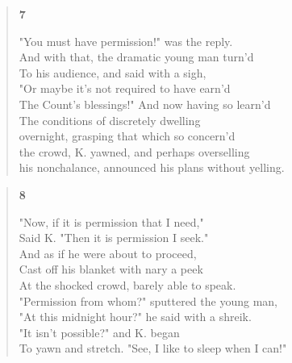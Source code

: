 \documentclass{article}
\begin{document}
\begin{verse}
  \begin{center}
    \textbf{7} \\
  \end{center}
  "You must have permission!" was the reply. \\
  And with that, the dramatic young man turn'd \\
  To his audience, and said with a sigh, \\
  "Or maybe it's not required to have earn'd \\
  The Count's blessings!" And now having so learn'd \\
  The conditions of discretely dwelling \\
  overnight, grasping that which so concern'd \\
  the crowd, K. yawned, and perhaps overselling \\
  his nonchalance, announced his plans without yelling.
\end{verse}
\begin{verse}
  \begin{center}
    \textbf{8} \\
  \end{center}
  "Now, if it is permission that I need," \\
  Said K. "Then it is permission I seek." \\
  And as if he were about to proceed, \\
  Cast off his blanket with nary a peek \\
  At the shocked crowd, barely able to speak. \\
  "Permission from whom?" sputtered the young man, \\
  "At this midnight hour?" he said with a shreik. \\
  "It isn't possible?" and K. began \\
  To yawn and stretch. "See, I like to sleep when I can!"

\end{verse}
\end{document}
